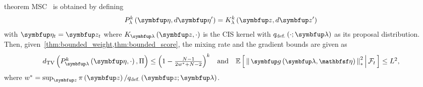
\begin{theoremEnd}{theorem}\label{thm:msc}
  MSC~\citep{NEURIPS2020_b2070693} is obtained by defining 
  {%
  \begin{align*}
  P_{\lambda}^k\left(\veta, d\veta^{\prime}\right)
  = 
  K_{\lambda}^k\left(\vz, d\vz^{\prime}\right)
  \end{align*}
  }
  with  \(\veta_t = \vz_t\) where \(K_{\vlambda}\left(\vz, \cdot\right)\) is the CIS kernel with \(q_{\text{def.}}\left(\cdot; \vlambda\right)\) as its proposal distribution.
  Then, given~\cref{thm:bounded_weight,thm:bounded_score}, the mixing rate and the gradient bounds are given as
  {%
  \begin{align*}
    \textstyle
  \DTV{P_{\vlambda}^k\left(\veta, \cdot\right)}{\Pi} \leq  {\left(1 - \frac{N - 1}{2 w^* + N - 2}\right)}^k\quad \text{and}\quad
  {\small
  \E{ \norm{ \vg\left(\vlambda, \rvveta\right) }_{*}^2 \,\middle|\, \mathcal{F}_{t} } \leq  L^2,
  }
  \end{align*}
  }
  where \(w^* = \sup_{\vz} \pi\left(\vz\right) / q_{\text{def.}}\left(\vz;\vlambda\right)\).
\end{theoremEnd}
